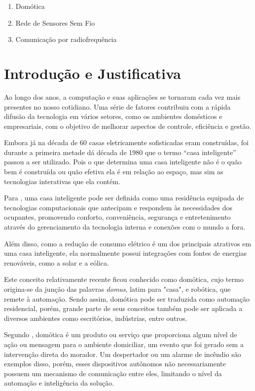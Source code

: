 \documentclass[
    12pt,               %
    a4paper,            %
    english,            %
    brazil,             %
    ]{article}
\begin{document}
        \begin{enumerate}
            \item Domótica
			\item Rede de Sensores Sem Fio
			\item Comunicação por radiofrequência
        \end{enumerate}


\section{Introdução e Justificativa}
Ao longo dos anos, a computação e suas aplicações se tornaram cada vez mais presentes no nosso cotidiano. Uma série de fatores
contribuiu com a rápida difusão da tecnologia em vários setores, como os ambientes domésticos e empresariais, com o objetivo de
melhorar aspectos de controle, eficiência e gestão.

Embora já na década de 60 casas eletricamente sofisticadas eram construídas, foi durante a primeira metade dá década de 1980 que o
termo  ``casa inteligente'' passou a ser utilizado. Pois o que determina uma casa inteligente não é o quão bem é construída ou
quão efetiva ela é em relação ao espaço, mas sim as tecnologias interativas que ela contém. \cite{harper2003}

Para , uma casa inteligente pode ser definida como uma residência equipada de tecnologias computacionais
que antecipam e respondem às necessidades dos ocupantes, promovendo conforto, conveniência, segurança e entretenimento através do
gerenciamento da tecnologia interna e conexões com o mundo a fora.

Além disso, como a redução de consumo elétrico é um dos principais atrativos em uma casa inteligente, ela normalmente possui
integrações com fontes de energias renováveis, como a solar e a eólica.

Este conceito relativamente recente ficou conhecido como domótica, cujo termo origina-se da junção das palavras \textit{domus},
latim para "casa", e robótica, que remete à automação. Sendo assim, domótica pode ser traduzida como automação residencial, porém,
grande parte de seus conceitos também pode ser aplicada a diversos ambientes como escritórios, indústrias, entre outros.

Segundo , domótica é um produto ou serviço que proporciona algum nível de ação ou mensagem para o ambiente
domiciliar, um evento que foi gerado sem a intervenção direta do morador. Um despertador ou um alarme de incêndio são exemplos
disso, porém, esses dispositivos autônomos não necessariamente possuem um mecanismo de comunicação entre eles, limitando o nível
da automação e inteligência da solução.
\end{document}
